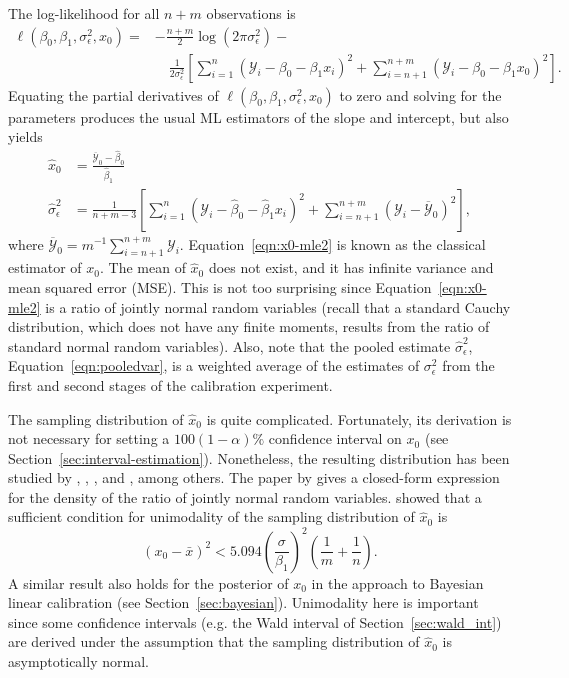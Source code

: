\documentclass[cmfont,usenames,dvipsnames,leqno]{afit-etd}\usepackage[]{graphicx}\usepackage[]{color}
\newcommand{\mc}[1]{\ensuremath{\mathcal{#1}}}
\newcommand{\wh}[1]{\ensuremath{\widehat{#1}}}
\newcommand{\wb}[1]{\ensuremath{\overline{#1}}}
\begin{document}
The log-likelihood for all $n + m$ observations is
\begin{equation*}
\begin{split}
  \ell\left(\beta_0, \beta_1, \sigma_\epsilon^2, x_0\right) = &-\frac{n+m}{2}\log(2\pi\sigma_\epsilon^2)-\\ &\quad \frac{1}{2\sigma_\epsilon^2}\left[\sum_{i=1}^n(\mc{Y}_i-\beta_0-\beta_1x_i)^2 + \sum_{i=n+1}^{n+m}(\mc{Y}_i-\beta_0-\beta_1x_0)^2\right].
\end{split}
\end{equation*}
Equating the partial derivatives of $\ell\left(\beta_0, \beta_1, \sigma_\epsilon^2, x_0\right)$ to zero and solving for the parameters produces the usual \ac{ML} estimators of the slope and intercept, but also yields
\begin{align}
  \wh{x}_0 &= \frac{\wb{\mc{Y}}_0-\wh{\beta}_0}{\wh{\beta}_1} \label{eqn:x0-mle2} \\
  \wh{\sigma}_\epsilon^2 &= \frac{1}{n+m-3}\left[\sum_{i=1}^n\left(\mc{Y}_i-\wh{\beta}_0-\wh{\beta}_1 x_i\right)^2 + \sum_{i=n+1}^{n+m}\left(\mc{Y}_i-\wb{\mc{Y}}_0\right)^2\right] \label{eqn:pooledvar},
\end{align}
where $\wb{\mc{Y}}_0 = m^{-1}\sum_{i=n+1}^{n+m}\mc{Y}_i$. Equation~\eqref{eqn:x0-mle2} is known as the classical estimator of $x_0$. The mean of $\wh{x}_0$ does not exist, and it has infinite variance and mean squared error (MSE). This is not too surprising since Equation~\eqref{eqn:x0-mle2} is a ratio of jointly normal random variables (recall that a standard Cauchy distribution, which does not have any finite moments, results from the ratio of standard normal random variables). Also, note that the pooled estimate $\wh{\sigma}_\epsilon^2$, Equation~\eqref{eqn:pooledvar}, is a weighted average of the estimates of $\sigma_\epsilon^2$ from the first and second stages of the calibration experiment. 

The sampling distribution of $\wh{x}_0$ is quite complicated. Fortunately, its derivation is not necessary for setting a $100(1-\alpha)\%$ confidence interval on $x_0$ (see Section~\ref{sec:interval-estimation}). Nonetheless, the resulting distribution has been studied by \citet{fieller_distribution_1932}, \citet{hinkley_ratio_1969}, \citet{buonaccorsi_design_1986}, and \citet{pham-gia_density_2006}, among others. The paper by \citet{pham-gia_density_2006} gives a closed-form expression for the density of the ratio of jointly normal random variables. \citet{buonaccorsi_design_1986} showed that a sufficient condition for unimodality of the sampling distribution of $\wh{x}_0$ is
\begin{equation*}
  (x_0 - \bar{x})^2 < 5.094 \left(\frac{\sigma}{\beta_1}\right)^2 \left( \frac{1}{m} + \frac{1}{n} \right).
\end{equation*}
A similar result also holds for the posterior of $x_0$ in the \citet{hunter_bayesian_1981} approach to Bayesian linear calibration (see Section~\ref{sec:bayesian}). Unimodality here is important since some confidence intervals (e.g. the Wald interval of Section~\ref{sec:wald_int}) are derived under the assumption that the sampling distribution of $\wh{x}_0$ is asymptotically normal. 
\end{document}
